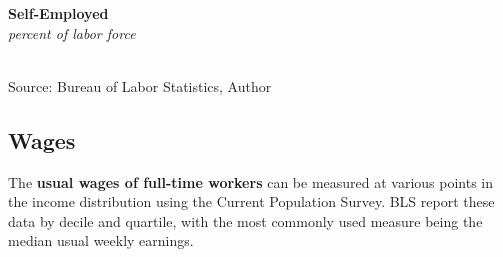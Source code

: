 \documentclass{report}
\makeatletter
\newcommand{\tbllink}[1]{\href{https://raw.githubusercontent.com/bdecon/US-chartbook/master/chartbook/data/#1}{\faTable}}
\newcommand*\short[1]{\expandafter\@gobbletwo\number\numexpr#1\relax}
\newcommand{\absnode}[3]{\node[below right, align=left] at (axis cs: #1,#2) {#3};}
\newcommand{\shdateaxisticks}{
		date coordinates in=x, axis line style={draw=none},
		xmax={2022-10-31},
		max space between ticks=40,	    
		xtick={{1990-01-01}, {1995-01-01}, {2000-01-01}, 
			{2005-01-01}, {2010-01-01}, {2015-01-01}, {2020-01-01}},
		minor xtick={},
		enlarge y limits={0.06}, enlarge x limits={0.01},
		}
\newcommand{\bbar}[2]{extra #1 ticks = {{#2}}, extra #1 tick labels = ,
		extra #1 tick style = {grid=major, grid style={thick, black!25}},}
\newcommand{\stdline}[4]{\addplot[very thick, no markers, color=#1] 
		table [x=#2, y=#3, col sep=comma] {#4};	}
\newcommand{\rbars}{
		\fill[color=black!10] (axis cs:{1990-07-01},\pgfkeysvalueof{/pgfplots/ymin}) rectangle 
			(axis cs:{1991-03-01}, \pgfkeysvalueof{/pgfplots/ymax});
		\fill[color=black!10] (axis cs:{2007-12-01},\pgfkeysvalueof{/pgfplots/ymin}) rectangle 
			(axis cs:{2009-07-01}, \pgfkeysvalueof{/pgfplots/ymax});
		\fill[color=black!10] (axis cs:{2001-03-01},\pgfkeysvalueof{/pgfplots/ymin}) rectangle 
			(axis cs:{2001-11-01}, \pgfkeysvalueof{/pgfplots/ymax});
		\fill[color=black!10] (axis cs:{2020-02-01},\pgfkeysvalueof{/pgfplots/ymin}) rectangle 
			(axis cs:{2020-05-01}, \pgfkeysvalueof{/pgfplots/ymax});}
\makeatother
\begin{document}
{\begin{minipage}{0.76\textwidth}
\begin{minipage}{0.56\textwidth}
\normalsize \textbf{Self-Employed}\\
\footnotesize{\textit{percent of labor force}}\\
\hspace*{-2mm} \\
\footnotesize{Source: Bureau of Labor Statistics, Author} \hfill \tbllink{selfemp.csv} 
\end{minipage} \hfill
\begin{minipage}{0.38\textwidth}
\small 
\end{minipage}
\end{minipage}
\newpage
\begin{minipage}{0.76\textwidth}
\subsection*{Wages}
\hypertarget{labw}{}
\small The \textbf{usual wages of full-time workers} can be measured at various points in the income distribution using the Current Population Survey. BLS report these data by decile and quartile, with the most commonly used measure being the median usual weekly earnings.


\vspace{3mm}


\end{minipage}}
\end{document}
